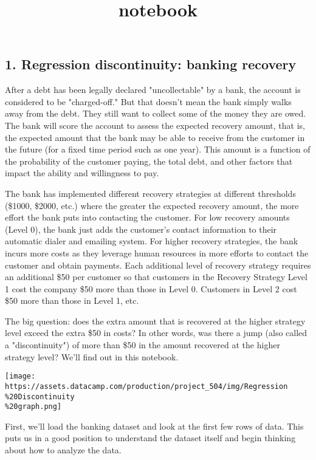 \documentclass[11pt]{article}
\title{notebook}
\makeatletter
\def\maxwidth{\ifdim\Gin@nat@width>\linewidth\linewidth
    \else\Gin@nat@width\fi}
\let\Oldincludegraphics\includegraphics
\renewcommand{\includegraphics}[1]{\Oldincludegraphics[width=.8\maxwidth]{#1}}
\makeatother
\begin{document}
    
    
    \maketitle
    
    

    
    \subsection{1. Regression discontinuity: banking
recovery}\label{regression-discontinuity-banking-recovery}

After a debt has been legally declared "uncollectable" by a bank, the
account is considered to be "charged-off." But that doesn't mean the
bank simply walks away from the debt. They still want to collect some of
the money they are owed. The bank will score the account to assess the
expected recovery amount, that is, the expected amount that the bank may
be able to receive from the customer in the future (for a fixed time
period such as one year). This amount is a function of the probability
of the customer paying, the total debt, and other factors that impact
the ability and willingness to pay.

The bank has implemented different recovery strategies at different
thresholds (\$1000, \$2000, etc.) where the greater the expected
recovery amount, the more effort the bank puts into contacting the
customer. For low recovery amounts (Level 0), the bank just adds the
customer's contact information to their automatic dialer and emailing
system. For higher recovery strategies, the bank incurs more costs as
they leverage human resources in more efforts to contact the customer
and obtain payments. Each additional level of recovery strategy requires
an additional \$50 per customer so that customers in the Recovery
Strategy Level 1 cost the company \$50 more than those in Level 0.
Customers in Level 2 cost \$50 more than those in Level 1, etc.

The big question: does the extra amount that is recovered at the higher
strategy level exceed the extra \$50 in costs? In other words, was there
a jump (also called a "discontinuity") of more than \$50 in the amount
recovered at the higher strategy level? We'll find out in this notebook.

\texttt{[image: https://assets.datacamp.com/production/project\_504/img/Regression\\\%20Discontinuity\\\%20graph.png]}

First, we'll load the banking dataset and look at the first few rows of
data. This puts us in a good position to understand the dataset itself
and begin thinking about how to analyze the data.
\end{document}
